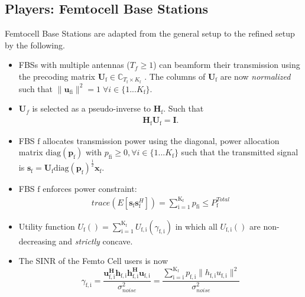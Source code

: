 \documentclass[12pt,a4paper]{report}
\begin{document}
\subsection{Players: Femtocell Base Stations}
Femtocell Base Stations are adapted from the general setup to the refined setup by the following.
\begin{itemize}
\item 
	FBSs with multiple antennas ($T_f \geq 1$) can beamform their transmission using the precoding 	
	matrix $\mathbf{U}_{\mathrm{\text{f}}} \in \mathbb{C}_{T_{\text{f}} \times K_{\text{f}}}$ .
	The columns of $\mathbf{U}_{\mathrm{f}}$ are now \emph{normalized} such that 
	 $\|\mathbf{u}_{\mathrm{fi}}\|^2 =1 \;\forall i \in \{1 ... K_{\text{f}}\}$.
\\

\item 
$\mathbf{U}_f$ is selected as a pseudo-inverse to $\mathbf{H_\mathrm{f}}$.
Such that
\begin{gather*}
\mathbf{H}_{\mathrm{f}}  \mathbf{U_{\mathrm{f}}} = \mathbf{I}.
\end{gather*} 


\item  
	FBS $\text{f}$ allocates transmission power using the diagonal, power allocation  	
	matrix $\mathrm{diag}(\mathbf{p}_{\mathrm{f}})$ with $p_{\mathrm{fi}} \geq 0, \forall i \in \{1 ... K_{\text{f}}\}$
such that the transmitted 		
	signal is 
	$\mathbf{s}_{\mathrm{f}	}= \mathbf{U_{\mathrm{f}}} 
	\mathrm{diag}(\mathbf{p}_{\mathrm{f}})^{\frac{1}{2}}
	\mathbf{x_{\mathrm{f}}}$.
\\
\item 
	FBS $\text{f}$ enforces power constraint:
	\begin{gather*}
	trace(E[\mathbf{s}_\mathrm{f}\mathbf{s}_\mathrm{f}^H]) =
	\sum_{\mathrm{i=1}}^{\mathrm{K_{\mathrm{f}}}} p_{\mathrm{fi}}
	  \leq P^{Total}_{\text{f}} 
	  	\end{gather*}



\item 
	Utility function $U_{\text{f}}() =
	\sum_{\mathrm{i=1}}^{\mathrm{K_{\text{f}}}}
    	U_{\mathrm{f,i}}(\gamma_{\mathrm{f,i}}) $
    	in which all $U_{\mathrm{f,i}}()$ are non-decreasing and
    	\emph{strictly} concave.
\item The SINR of the Femto Cell users is now
\begin{equation}\label{zf_snr}
	\gamma_{\mathrm{f,i}} = 	\frac{\mathbf{u^H_{\mathrm{f,i}}h_{\mathrm{f,i}}h^H_{\mathrm{f,i}}u_{\mathrm{f,i}}}}
	{\sigma^2_{noise}  
	}=\frac{\sum_{\mathrm{i=i}}^{\mathrm{K_{f}}}
 p_{\mathrm{f,i}}\|h_{\mathrm{f,i}}u_{\mathrm{f,i}}\|^2}
	{\sigma^2_{noise}  
	}
	\end{equation}

\end{itemize}
\end{document}
